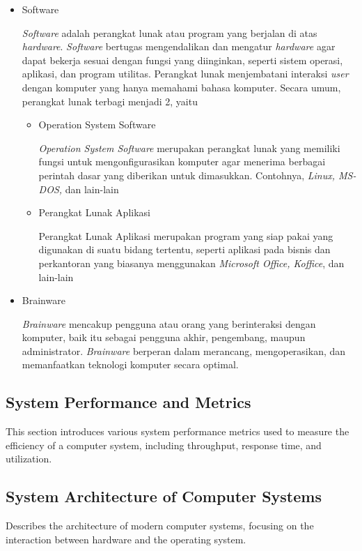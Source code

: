 \documentclass[12pt]{article}
\begin{document}
\begin{itemize}
        \item Software 
        \par
        \textit{Software} adalah perangkat lunak atau program yang berjalan di atas \textit{hardware}. \textit{Software} bertugas mengendalikan dan mengatur \textit{hardware} agar dapat bekerja sesuai dengan fungsi yang diinginkan, seperti sistem operasi, aplikasi, dan program utilitas. Perangkat lunak menjembatani interaksi\textit{ user} dengan komputer yang hanya memahami bahasa komputer. Secara umum, perangkat lunak terbagi menjadi 2, yaitu
        \begin{itemize}
            \item Operation System Software
            \par
            \textit{Operation System Software} merupakan perangkat lunak yang memiliki fungsi untuk mengonfigurasikan komputer agar menerima berbagai perintah dasar yang diberikan untuk dimasukkan. Contohnya, \textit{Linux, MS-DOS,} dan lain-lain
            \item Perangkat Lunak Aplikasi
            \par
            Perangkat Lunak Aplikasi merupakan program yang siap pakai yang digunakan di suatu bidang tertentu, seperti aplikasi pada bisnis dan perkantoran yang biasanya menggunakan\textit{ Microsoft Office, Koffice}, dan lain-lain
        \end{itemize}
        \item Brainware 
        \par
       \textit{ Brainware } mencakup pengguna atau orang yang berinteraksi dengan komputer, baik itu sebagai pengguna akhir, pengembang, maupun administrator. \textit{Brainware }berperan dalam merancang, mengoperasikan, dan memanfaatkan teknologi komputer secara optimal.
    \end{itemize}
   

\subsection{System Performance and Metrics}
This section introduces various system performance metrics used to measure the efficiency of a computer system, including throughput, response time, and utilization.

\subsection{System Architecture of Computer Systems}
Describes the architecture of modern computer systems, focusing on the interaction between hardware and the operating system.
\end{document}
